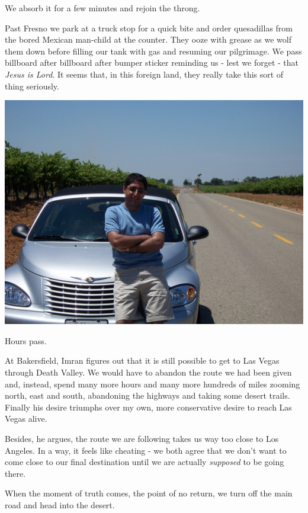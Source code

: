 \documentclass[a5paper,titlepage,11pt]{book}
\begin{document}
We absorb it for a few minutes and rejoin the throng.

Past Fresno we park at a truck stop for a quick bite and order quesadillas from the bored Mexican man-child at the counter.  They ooze with grease as we wolf them down before filling our tank with gas and resuming our pilgrimage.  We pass billboard after billboard after bumper sticker reminding us - lest we forget - that \emph{Jesus is Lord}.  It seems that, in this foreign land, they really take this sort of thing seriously.

\begin{center}\includegraphics[width=\textwidth]{gfx/100_1307}\end{center}

Hours pass.

At Bakersfield, Imran figures out that it is still possible to get to Las Vegas through Death Valley.  We would have to abandon the route we had been given and, instead, spend many more hours and many more hundreds of miles zooming north, east and south, abandoning the highways and taking some desert trails.  Finally his desire triumphs over my own, more conservative desire to reach Las Vegas alive.

Besides, he argues, the route we are following takes us way too close to Los Angeles.  In a way, it feels like cheating - we both agree that we don't want to come close to our final destination until we are actually \emph{supposed} to be going there.

When the moment of truth comes, the point of no return, we turn off the main road and head into the desert.
\end{document}
